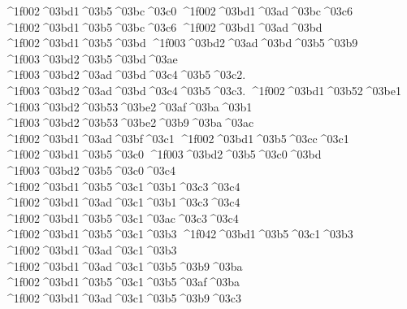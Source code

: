{^^^^1f002^^^^03bd1^^^^03b5^^^^03bc^^^^03c0
^^^^1f002^^^^03bd1^^^^03ad^^^^03bc^^^^03c6  		%
^^^^1f002^^^^03bd1^^^^03b5^^^^03bc^^^^03c6
^^^^1f002^^^^03bd1^^^^03ad^^^^03bd   		%
^^^^1f002^^^^03bd1^^^^03b5^^^^03bd
	^^^^1f003^^^^03bd2^^^^03ad^^^^03bd^^^^03b5^^^^03b9  		%
	^^^^1f003^^^^03bd2^^^^03b5^^^^03bd^^^^03ae   		%
	^^^^1f003^^^^03bd2^^^^03ad^^^^03bd^^^^03c4^^^^03b5^^^^03c2. 		%
	^^^^1f003^^^^03bd2^^^^03ad^^^^03bd^^^^03c4^^^^03b5^^^^03c3.
^^^^1f002^^^^03bd1^^^^03b52^^^^03be1  		%
	^^^^1f003^^^^03bd2^^^^03b53^^^^03be2^^^^03af^^^^03ba^^^^03b1 		%
	^^^^1f003^^^^03bd2^^^^03b53^^^^03be2^^^^03b9^^^^03ba^^^^03ac
^^^^1f002^^^^03bd1^^^^03ad^^^^03bf^^^^03c1		%
^^^^1f002^^^^03bd1^^^^03b5^^^^03cc^^^^03c1
^^^^1f002^^^^03bd1^^^^03b5^^^^03c0    		%
	^^^^1f003^^^^03bd2^^^^03b5^^^^03c0^^^^03bd  	%
	^^^^1f003^^^^03bd2^^^^03b5^^^^03c0^^^^03c4  	%
^^^^1f002^^^^03bd1^^^^03b5^^^^03c1^^^^03b1^^^^03c3^^^^03c4  		%
^^^^1f002^^^^03bd1^^^^03ad^^^^03c1^^^^03b1^^^^03c3^^^^03c4 		%
^^^^1f002^^^^03bd1^^^^03b5^^^^03c1^^^^03ac^^^^03c3^^^^03c4
^^^^1f002^^^^03bd1^^^^03b5^^^^03c1^^^^03b3    		%
^^^^1f042^^^^03bd1^^^^03b5^^^^03c1^^^^03b3   		%
^^^^1f002^^^^03bd1^^^^03ad^^^^03c1^^^^03b3
^^^^1f002^^^^03bd1^^^^03ad^^^^03c1^^^^03b5^^^^03b9^^^^03ba 		%
^^^^1f002^^^^03bd1^^^^03b5^^^^03c1^^^^03b5^^^^03af^^^^03ba
^^^^1f002^^^^03bd1^^^^03ad^^^^03c1^^^^03b5^^^^03b9^^^^03c3 		%
}
